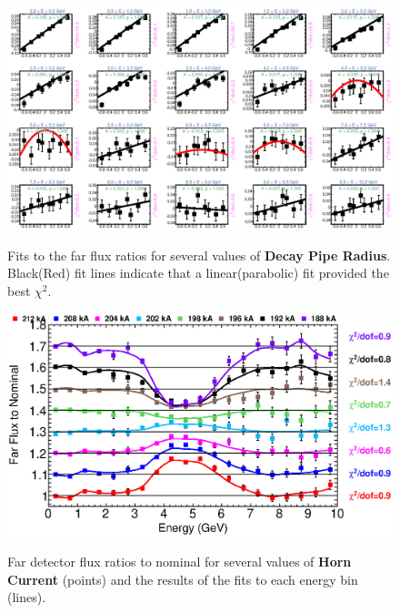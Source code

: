 \begin{figure}[ht]
  \begin{center}
    {\includegraphics[width=5.0in]{figures/DecayPipeRadius_far_fits.eps}}
  \end{center}
\caption{ Fits to the far flux ratios for several values of {\bf Decay Pipe Radius}. Black(Red) fit lines indicate that a linear(parabolic) fit provided the best $\chi^2$. }
\end{figure}

\begin{figure}[ht]
  \begin{center}
    {\includegraphics[width=6.0in]{figures/HornCurrent_far_summary.eps}}
  \end{center}
\caption{ Far detector flux ratios to nominal for several values of {\bf Horn Current} (points) and the results of the fits to each energy bin (lines).}
\end{figure}

